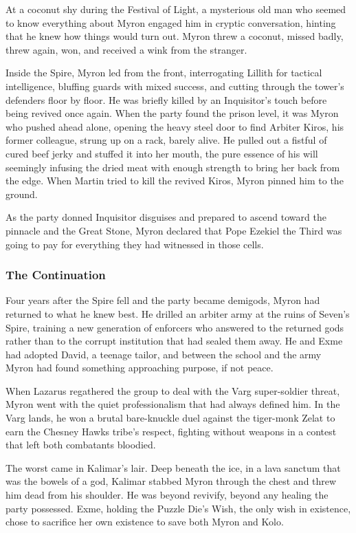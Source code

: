 At a coconut shy during the Festival of Light, a mysterious old man who seemed to know everything about Myron engaged him in cryptic conversation, hinting that he knew how things would turn out.  Myron threw a coconut, missed badly, threw again, won, and received a wink from the stranger.

Inside the Spire, Myron led from the front, interrogating Lillith for tactical intelligence, bluffing guards with mixed success, and cutting through the tower's defenders floor by floor.  He was briefly killed by an Inquisitor's touch before being revived once again.  When the party found the prison level, it was Myron who pushed ahead alone, opening the heavy steel door to find Arbiter Kiros, his former colleague, strung up on a rack, barely alive.  He pulled out a fistful of cured beef jerky and stuffed it into her mouth, the pure essence of his will seemingly infusing the dried meat with enough strength to bring her back from the edge.  When Martin tried to kill the revived Kiros, Myron pinned him to the ground.

As the party donned Inquisitor disguises and prepared to ascend toward the pinnacle and the Great Stone, Myron declared that Pope Ezekiel the Third was going to pay for everything they had witnessed in those cells.

\subsubsection{The Continuation}

Four years after the Spire fell and the party became demigods, Myron had returned to what he knew best.  He drilled an arbiter army at the ruins of Seven's Spire, training a new generation of enforcers who answered to the returned gods rather than to the corrupt institution that had sealed them away.  He and Exme had adopted David, a teenage tailor, and between the school and the army Myron had found something approaching purpose, if not peace.

When Lazarus regathered the group to deal with the Varg super-soldier threat, Myron went with the quiet professionalism that had always defined him.  In the Varg lands, he won a brutal bare-knuckle duel against the tiger-monk Zelat to earn the Chesney Hawks tribe's respect, fighting without weapons in a contest that left both combatants bloodied.

The worst came in Kalimar's lair.  Deep beneath the ice, in a lava sanctum that was the bowels of a god, Kalimar stabbed Myron through the chest and threw him dead from his shoulder.  He was beyond revivify, beyond any healing the party possessed.  Exme, holding the Puzzle Die's Wish, the only wish in existence, chose to sacrifice her own existence to save both Myron and Kolo.

